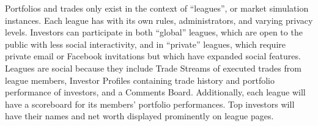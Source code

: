 Portfolios and trades only exist in the context of “leagues”, or market simulation instances. 
Each league has with its own rules, administrators, and varying privacy levels. Investors can 
participate in both “global” leagues, which are open to the public with less social interactivity, 
and in “private” leagues, which require private email or Facebook invitations but which have 
expanded social features. Leagues are social because they include Trade Streams of executed trades 
from league members, Investor Profiles containing trade history and portfolio performance of 
investors, and a Comments Board. Additionally, each league will have a scoreboard for its members’
portfolio performances. Top investors will have their names and net worth displayed prominently on
league pages. 